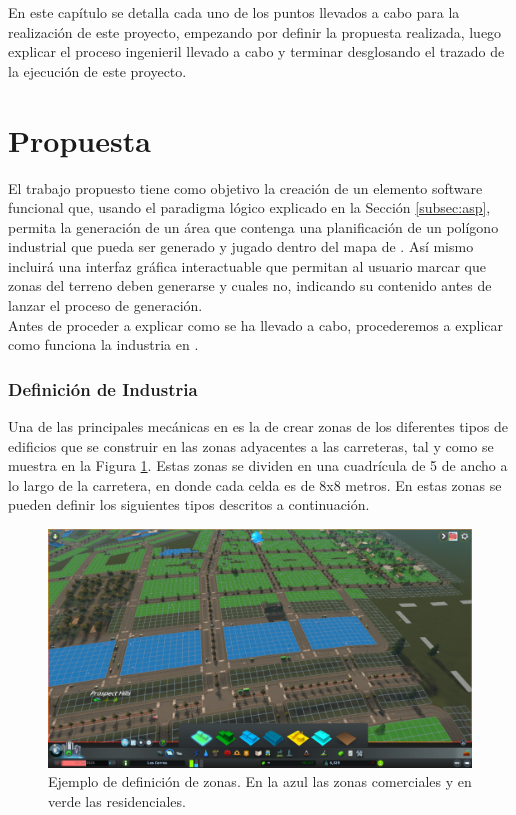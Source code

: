 En este capítulo se detalla cada uno de los puntos llevados a cabo para la realización de este proyecto, empezando por definir la propuesta realizada, luego explicar el proceso ingenieril llevado a cabo y terminar desglosando el trazado de la ejecución de este proyecto.

\section{Propuesta}

El trabajo propuesto tiene como objetivo la creación de un elemento software funcional que, usando el paradigma lógico explicado en la Sección \ref{subsec:asp}, permita la generación de un área que contenga una planificación de un polígono industrial que pueda ser generado y jugado dentro del mapa de \cities. Así mismo incluirá una interfaz gráfica interactuable que permitan al usuario marcar que zonas del terreno deben generarse y cuales no, indicando su contenido antes de lanzar el proceso de generación. \\

Antes de proceder a explicar como se ha llevado a cabo, procederemos a explicar como funciona la industria en \cities.

\subsubsection{Definición de Industria}
\label{subsubsec:terrain}

Una de las principales mecánicas en \cities es la de crear zonas de los diferentes tipos de edificios que se construir en las zonas adyacentes a las carreteras, tal y como se muestra en la Figura \ref{fig:zoneo}. Estas zonas se dividen en una cuadrícula de 5 de ancho a lo largo de la carretera, en donde cada celda es de 8x8 metros. En estas zonas se pueden definir los siguientes tipos descritos a continuación.

\begin{figure}[!h]
	\centering
	\includegraphics[width=\textwidth]{images/zoneo}
	\caption{Ejemplo de definición de zonas. En la azul las zonas comerciales y en verde las residenciales.}
	\label{fig:zoneo}
\end{figure}

